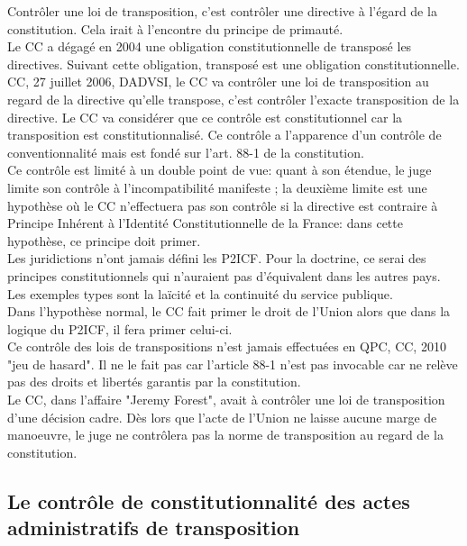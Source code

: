 \documentclass[10pt, a4paper, openany]{book}
\begin{document}
Contrôler une loi de transposition, c'est contrôler une directive à l'égard de la constitution. Cela irait à l'encontre du principe de primauté. \\
Le CC a dégagé en 2004 une obligation constitutionnelle de transposé les directives. Suivant cette obligation, transposé est une obligation constitutionnelle. \\
CC, 27 juillet 2006, DADVSI, le CC va contrôler une loi de transposition au regard de la directive qu'elle transpose, c'est contrôler l'exacte transposition de la directive. Le CC va considérer que ce contrôle est constitutionnel car la transposition est constitutionnalisé. Ce contrôle a l'apparence d'un contrôle de conventionnalité mais est fondé sur l'art. 88-1 de la constitution. \\
Ce contrôle est limité à un double point de vue: quant à son étendue, le juge limite son contrôle à l'incompatibilité manifeste ; la deuxième limite est une hypothèse où le CC n'effectuera pas son contrôle si la directive est contraire à Principe Inhérent à l'Identité Constitutionnelle de la France: dans cette hypothèse, ce principe doit primer. \\
Les juridictions n'ont jamais défini les P2ICF. Pour la doctrine, ce serai des principes constitutionnels qui n'auraient pas d'équivalent dans les autres pays. Les exemples types sont la laïcité et la continuité du service publique. \\
Dans l'hypothèse normal, le CC fait primer le droit de l'Union alors que dans la logique du P2ICF, il fera primer celui-ci. \\
Ce contrôle des lois de transpositions n'est jamais effectuées en QPC, CC, 2010 "jeu de hasard". Il ne le fait pas car l'article 88-1 n'est pas invocable car ne relève pas des droits et libertés garantis par la constitution. \\
Le CC, dans l'affaire "Jeremy Forest", avait à contrôler une loi de transposition d'une décision cadre. Dès lors que l'acte de l'Union ne laisse aucune marge de manoeuvre, le juge ne contrôlera pas la norme de transposition au regard de la constitution. 


\subsection{Le contrôle de constitutionnalité des actes administratifs de transposition}
\end{document}
